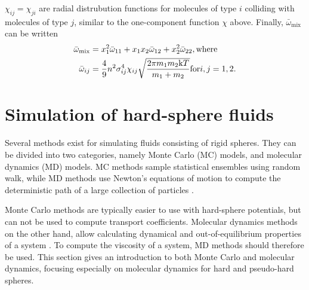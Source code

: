$\chi_{ij} = \chi_{ji}$ are radial distrubution functions for molecules 
of type $i$ colliding with molecules of type $j$, 
similar to the one-component function $\chi$ above.
Finally, $\bar{\omega}_{\text{mix}}$ can be written
\begin{equation}
    \begin{split}
        \bar{\omega}_{\text{mix}} 
            &= x_1^2 \bar{\omega}_{11} 
            + x_1 x_2 \bar{\omega}_{12} 
            + x_2^2 \bar{\omega}_{22}, \text{where}\\
        \bar{\omega}_{ij} 
            &= \frac{4}{9} n^2 \sigma_{ij}^4 \chi_{ij} 
            \sqrt{\frac{2\pi m_1 m_2 \mathrm{k} T}{m_1 + m_2}} 
            \text{for} i,j = 1,2.
    \end{split}
\end{equation}



\section{Simulation of hard-sphere fluids}
Several methods exist for simulating fluids consisting of rigid spheres.
They can be divided into two categories, namely Monte Carlo (MC) models,
and molecular dynamics (MD) models.
MC methods sample statistical ensembles using random walk,  %
while MD methods use Newton's equations of motion to compute the deterministic
path of a large collection of particles \cite{ref:allen:MD_sim}.

Monte Carlo methods are typically easier to use with hard-sphere potentials,
but can not be used to compute transport coefficients. 
Molecular dynamics methods on the other hand, allow calculating dynamical 
and out-of-equilibrium properties of a system \cite{ref:allen:MD_sim}.
To compute the viscosity of a system, MD methods should therefore be used.
This section gives an introduction to both Monte Carlo and molecular dynamics,
focusing especially on molecular dynamics for hard and pseudo-hard spheres.

